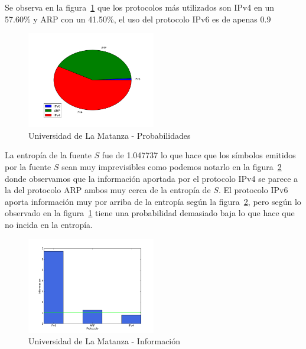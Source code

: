 \documentclass[final,inline,narroweqnarray,a4paper]{ieee}
\begin{document}
Se observa en la figura~\ref{torta:universidadLMS} que los protocolos más utilizados son IPv4 en un 57.60\% y ARP con un 41.50\%, el uso del protocolo IPv6 es de apenas 0.9%

\begin{figure}[H]
    \begin{center}
        \includegraphics[width=0.5\textwidth]{plot/facultadS-pie.png}
        \caption{Universidad de La Matanza - Probabilidades}
        \label{torta:universidadLMS}
    \end{center}
\end{figure}

La entropía de la fuente $S$ fue de 1.047737 lo que hace que los símbolos emitidos por la fuente $S$ sean muy imprevisibles como podemos notarlo en la figura~\ref{histo:universidadLMS} donde observamos que la información aportada por el protocolo IPv4 se parece a la del protocolo ARP ambos muy cerca de la entropía de $S$. El protocolo IPv6 aporta información muy por arriba de la entropía según la figura~\ref{histo:universidadLMS}, pero según lo observado en la figura~\ref{torta:universidadLMS} tiene una probabilidad demasiado baja lo que hace que no incida en la entropía.

\begin{figure}[H]
    \begin{center}
        \includegraphics[width=0.5\textwidth]{plot/facultadS-bar.png}
        \caption{Universidad de La Matanza - Información}
        \label{histo:universidadLMS}
    \end{center}
\end{figure}
\end{document}
